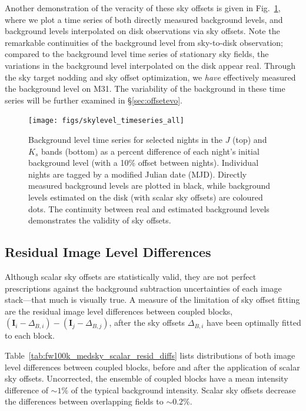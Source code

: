 \documentclass[iop]{emulateapj}
\newcommand{\vect}[1]{\boldsymbol{#1}} %
\newcommand{\Fig}[1]{Fig.~\ref{fig:#1}}  %
\newcommand{\Tab}[1]{Table~\ref{tab:#1}}  %
\newcommand{\Sec}[1]{\S\ref{sec:#1}}  %
\begin{document}
Another demonstration of the veracity of these sky offsets is given in \Fig{skylevel_timeseries}, where we plot a time series of both directly measured background levels, and background levels interpolated on disk observations via sky offsets.
Note the remarkable continuities of the background level from sky-to-disk observation; compared to the background level time series of stationary sky fields, the variations in the background level interpolated on the disk appear real.
Through the sky target nodding and sky offset optimization, we \emph{have} effectively measured the background level on M31.
The variability of the background in these time series will be further examined in \Sec{offsetevo}.

\begin{figure}[t]
\centering
\texttt{[image: figs/skylevel\_timeseries\_all]}
\caption{Background level time series for selected nights in the $J$ (top) and $K_s$ bands (bottom) as a percent difference of each night's initial background level (with a 10\% offset between nights).
Individual nights are tagged by a modified Julian date (MJD).
Directly measured background levels are plotted in black, while background levels estimated on the disk (with scalar sky offsets) are coloured dots. The continuity between real and estimated background levels demonstrates the validity of sky offsets.}
\label{fig:skylevel_timeseries}
\end{figure}

\subsection{Residual Image Level Differences}
\label{sec:residual_diffs}

Although scalar sky offsets are statistically valid, they are not perfect prescriptions against the background subtraction uncertainties of each image stack---that much is visually true.
A measure of the limitation of sky offset fitting are the residual image level differences between coupled blocks, $(\vect{I}_i - \Delta_{B,i}) - (\vect{I}_j - \Delta_{B,j})$, after the sky offsets $\Delta_{B,i}$ have been optimally fitted to each block.

\Tab{fw100k_medsky_scalar_resid_diffs} lists distributions of both image level differences between coupled blocks, before and after the application of scalar sky offsets.
Uncorrected, the ensemble of coupled blocks have a mean intensity difference of $\sim 1\%$ of the typical background intensity.
Scalar sky offsets decrease the differences between overlapping fields to $\sim 0.2\%$.
\end{document}
